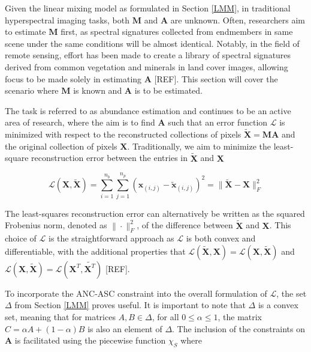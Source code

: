 Given the linear mixing model as formulated in Section \ref{LMM}, in traditional hyperspectral imaging tasks, both $\mathbf{M}$ and $\mathbf{A}$ are unknown. Often, researchers aim to estimate $\mathbf{M}$ first, as spectral signatures collected from endmembers in same scene under the same conditions will be almost identical. Notably, in the field of remote sensing, effort has been made to create a library of spectral signatures derived from common vegetation and minerals in land cover images, allowing focus to be made solely in estimating $\mathbf{A}$ [REF]. This section will cover the scenario where $\mathbf{M}$ is known and $\mathbf{A}$ is to be estimated. 

The task is referred to as abundance estimation and continues to be an active area of research, where the aim is to find $\mathbf{A}$ such that an error function $\mathcal{L}$ is minimized with respect to the reconstructed collections of pixels $\tilde{\mathbf{X}} = \mathbf{MA}$ and the original collection of pixels $\mathbf{X}$. Traditionally, we aim to minimize the least-square reconstruction error between the entries in $\tilde{\mathbf{X}}$ and $\mathbf{X}$

\begin{equation}
    \label{ae:fnorm}
    \mathcal{L}(\mathbf{X},\tilde{\mathbf{X}}) = \sum_{i=1}^{n_b} \sum_{j=1}^{n_p} \left(\mathbf{x}_{(i,j)} - \tilde{\mathbf{x}}_{(i,j)}\right)^2 = \|\tilde{\mathbf{X}} - \mathbf{X}\|_F^2
\end{equation}

The least-squares reconstruction error can alternatively be written as the squared Frobenius norm, denoted as $\|\cdot\|_F^2$, of the difference between  $\tilde{\mathbf{X}}$ and $\mathbf{X}$. This choice of $\mathcal{L}$ is the straightforward approach as $\mathcal{L}$ is both convex and differentiable, with the additional properties that $\mathcal{L}(\tilde{\mathbf{X}},\mathbf{X}) = \mathcal{L}(\mathbf{X},\tilde{\mathbf{X}})$ and $ \mathcal{L}(\mathbf{X},\tilde{\mathbf{X}}) = \mathcal{L}(\mathbf{X}^T,\tilde{\mathbf{X}^T})$ [REF].

To incorporate the ANC-ASC constraint into the overall formulation of $\mathcal{L}$, the set $\Delta$ from Section \ref{LMM} proves useful. It is important to note that $\Delta$ is a convex set, meaning that for matrices $A, B \in \Delta$, for all $0 \leq \alpha \leq 1$, the matrix $C = \alpha A + (1- \alpha)B$ is also an element of $\Delta$. The inclusion of the constraints on $\mathbf{A}$ is facilitated using the piecewise function $\chi_S$ where

